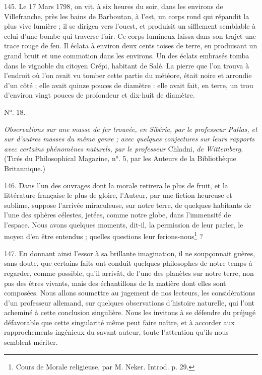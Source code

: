 \documentclass[a4paper, 11pt, oneside, polutonikogreek, french]{article}
\begin{document}
145. \og Le 17 Mars 1798, on vit, à six heures du soir, dans les environs de Villefranche, près les bains de Barboutan, à l'est, un corps rond qui répandit la plus vive lumière ; il se dirigea vers l'ouest, et produisit un sifflement semblable à celui d'une bombe qui traverse l'air. Ce corps lumineux laissa dans son trajet une trace rouge de feu. Il éclata à environ deux cents toises de terre, en produisant un grand bruit et une commotion dans les environs. Un des éclats embrasés tomba dans le vignoble du citoyen Crépi, habitant de Salé. La pierre que l'on trouva à l'endroit où l'on avait vu tomber cette partie du météore, était noire et arrondie d'un côté ; elle avait quinze pouces de diamètre : elle avait fait, en terre, un trou d'environ vingt pouces de profondeur et dix-huit de diamètre. \fg

\begin{center}
N°. 18.
\end{center}

\emph{Observations sur une masse de fer trouvée, en Sibérie, par le professeur Pallas, et sur d'autres masses du même genre ; avec quelques conjectures sur leurs rapports avec certains phénomènes naturels, par le professeur} Chladni, \emph{de Wittemberg}. (Tirés du Philosophical Magazine, n°. 5, par les Auteurs de la Bibliothèque Britannique.)

146. Dans l'un des ouvrages dont la morale retirera le plus de fruit, et la littérature française le plus de gloire, l'Auteur, par une fiction heureuse et sublime, suppose \og l'arrivée miraculeuse, sur notre terre, de quelques habitants de l'une des sphères célestes, jetées, comme notre globe, dans l'immensité de l'espace. Nous avons quelques moments, dit-il, la permission de leur parler, le moyen d'en être entendus ; quelles questions leur ferions-nous\footnote{Cours de Morale religieuse, par M. Neker. Introd. p. 29.} ?

147. En donnant ainsi l'essor à sa brillante imagination, il ne soupçonnait guères, sans doute, que certains faits ont conduit quelques philosophes de notre temps à regarder, comme possible, qu'il arrivât, de l'une des planètes sur notre terre, non pas des êtres vivants, mais des échantillons de la matière dont elles sont composées. Nous allons soumettre au jugement de nos lecteurs, les considérations d'un professeur allemand, sur quelques observations d'histoire naturelle, qui l'ont acheminé à cette conclusion singulière. Nous les invitons à se défendre du préjugé défavorable que cette singularité même peut faire naître, et à accorder aux rapprochements ingénieux du savant auteur, toute l'attention qu'ils nous semblent mériter.
\end{document}
